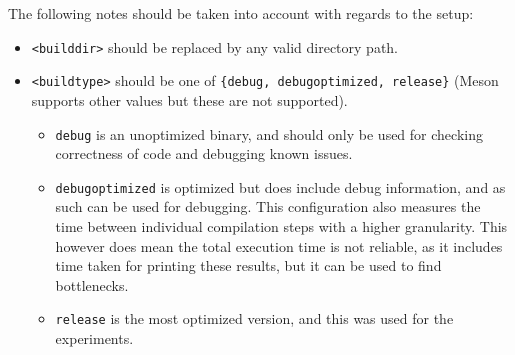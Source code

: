 \documentclass[11pt,dvipsnames]{article}
\newcommand{\mono}[1]{\texttt{#1}}
\begin{document}
The following notes should be taken into account with regards to the setup:
\begin{itemize}
    \item \mono{<builddir>} should be replaced by any valid directory path.
    \item \mono{<buildtype>} should be one of \mono{\{debug, debugoptimized, release\}} (Meson supports other values but these are not supported).
        \begin{itemize}
            \item \mono{debug} is an unoptimized binary, and should only be used for checking correctness of code and debugging known issues.
            \item \mono{debugoptimized} is optimized but does include debug information, and as such can be used for debugging.
                This configuration also measures the time between individual compilation steps with a higher granularity. This however does mean the total execution time is not reliable, as it includes time taken for printing these results, but it can be used to find bottlenecks.
            \item \mono{release} is the most optimized version, and this was used for the experiments.
        \end{itemize}
\end{itemize}
\end{document}

